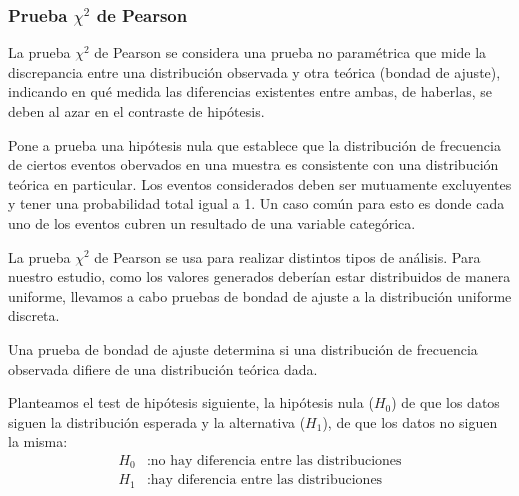 \subsubsection{Prueba \texorpdfstring{$\chi^2$}{X2} de Pearson}
La prueba $\chi^2$ de Pearson se considera una prueba no paramétrica que mide la discrepancia entre una distribución observada y otra teórica (bondad de ajuste), indicando en qué medida las diferencias existentes entre ambas, de haberlas, se deben al azar en el contraste de hipótesis.\cite{eswiki2022pearson}

Pone a prueba una hipótesis nula que establece que la distribución de frecuencia de ciertos eventos obervados en una muestra es consistente con una distribución teórica en particular. Los eventos considerados deben ser mutuamente excluyentes y tener una probabilidad total igual a 1. Un caso común para esto es donde cada uno de los eventos cubren un resultado de una variable categórica.

La prueba $\chi^{2}$ de Pearson se usa para realizar distintos tipos de análisis. Para nuestro estudio, como los valores generados deberían estar distribuidos de manera uniforme, llevamos a cabo pruebas de bondad de ajuste a la distribución uniforme discreta.

Una prueba de bondad de ajuste determina si una distribución de frecuencia observada difiere de una distribución teórica dada.

Planteamos el test de hipótesis siguiente, la hipótesis nula ($H_{0}$) de que los datos siguen la distribución esperada y la alternativa ($H_{1}$), de que los datos no siguen la misma:
\begin{align*}
H_{0}&: \text{no hay diferencia entre las distribuciones}\\
H_{1}&: \text{hay diferencia entre las distribuciones}
\end{align*}

